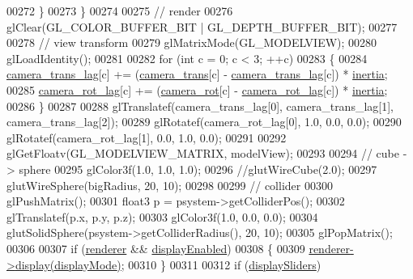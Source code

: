 \begin{DoxyCode}
{{{00272         \}
00273     \}
00274 
00275     \textcolor{comment}{// render}
00276     glClear(GL\_COLOR\_BUFFER\_BIT | GL\_DEPTH\_BUFFER\_BIT);
00277 
00278     \textcolor{comment}{// view transform}
00279     glMatrixMode(GL\_MODELVIEW);
00280     glLoadIdentity();
00281 
00282     \textcolor{keywordflow}{for} (\textcolor{keywordtype}{int} c = 0; c < 3; ++c)
00283     \{
00284         \hyperlink{particles_8cpp_a1475a0a4a9c24a5035d91125e5992afe}{camera\_trans\_lag}[c] += (\hyperlink{particles_8cpp_affab132fdfca08b149d2f866fd486ed4}{camera\_trans}[c] - 
      \hyperlink{particles_8cpp_a1475a0a4a9c24a5035d91125e5992afe}{camera\_trans\_lag}[c]) * \hyperlink{particles_8cpp_a639b27811b99d2487d6d94dd3c3b2a81}{inertia};
00285         \hyperlink{particles_8cpp_a2993bf9f16707b5c3ff46e0b751f0373}{camera\_rot\_lag}[c] += (\hyperlink{particles_8cpp_a9fcb578cacbd3a3b1ab593fc123cffb5}{camera\_rot}[c] - 
      \hyperlink{particles_8cpp_a2993bf9f16707b5c3ff46e0b751f0373}{camera\_rot\_lag}[c]) * \hyperlink{particles_8cpp_a639b27811b99d2487d6d94dd3c3b2a81}{inertia};
00286     \}
00287 
00288     glTranslatef(camera\_trans\_lag[0], camera\_trans\_lag[1], camera\_trans\_lag[2]);
00289     glRotatef(camera\_rot\_lag[0], 1.0, 0.0, 0.0);
00290     glRotatef(camera\_rot\_lag[1], 0.0, 1.0, 0.0);
00291 
00292     glGetFloatv(GL\_MODELVIEW\_MATRIX, modelView);
00293 
00294     \textcolor{comment}{// cube -> sphere}
00295     glColor3f(1.0, 1.0, 1.0);
00296     \textcolor{comment}{//glutWireCube(2.0);}
00297         glutWireSphere(bigRadius, 20, 10);
00298 
00299     \textcolor{comment}{// collider}
00300     glPushMatrix();
00301     float3 p = psystem->getColliderPos();
00302     glTranslatef(p.x, p.y, p.z);
00303     glColor3f(1.0, 0.0, 0.0);
00304     glutSolidSphere(psystem->getColliderRadius(), 20, 10);
00305     glPopMatrix();
00306 
00307     \textcolor{keywordflow}{if} (\hyperlink{particles_8cpp_a748beea58f866663fc6894969b21d061}{renderer} && \hyperlink{particles_8cpp_a14095d7bf2ff02e5172105454df40b9a}{displayEnabled})
00308     \{
00309         \hyperlink{particles_8cpp_a748beea58f866663fc6894969b21d061}{renderer}\hyperlink{class_particle_renderer_a80b2f52dc28bb3abbde021f7fe96f8ff}{->}\hyperlink{class_particle_renderer_a80b2f52dc28bb3abbde021f7fe96f8ff}{display}\hyperlink{class_particle_renderer_a80b2f52dc28bb3abbde021f7fe96f8ff}{(}\hyperlink{particles_8cpp_afd1b0caccb0d688ceb91c2547b9da1d9}{displayMode}\hyperlink{class_particle_renderer_a80b2f52dc28bb3abbde021f7fe96f8ff}{)};
00310     \}
00311 
00312     \textcolor{keywordflow}{if} (\hyperlink{particles_8cpp_ac345a677e529047cf89d33fc26f10fe7}{displaySliders})
}}}
\end{DoxyCode}
